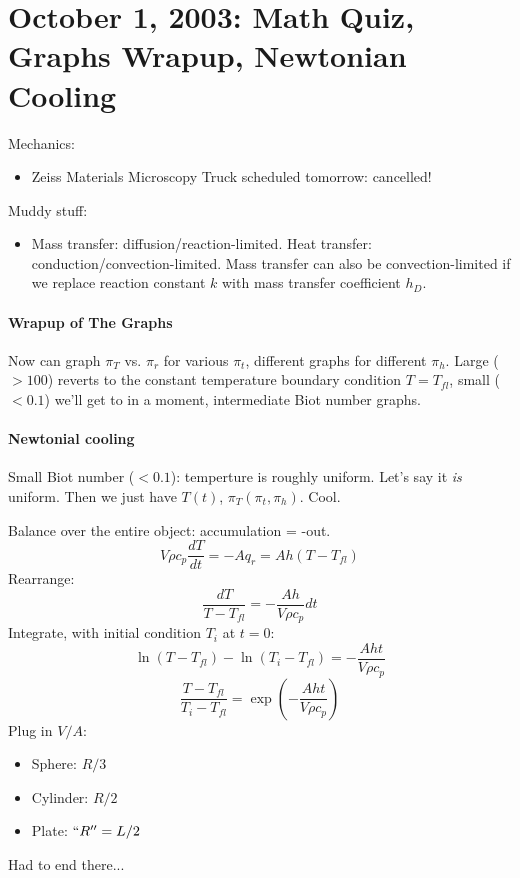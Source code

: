 \documentclass{report}
\begin{document}
\section{October 1, 2003: Math Quiz, Graphs Wrapup, Newtonian Cooling}

Mechanics:
\begin{itemize}
\item Zeiss Materials Microscopy Truck scheduled tomorrow: cancelled!
\end{itemize}

\noindent Muddy stuff:
\begin{itemize}
\item Mass transfer: diffusion/reaction-limited.  Heat transfer:
  conduction/convection-limited.  Mass transfer can also be convection-limited
  if we replace reaction constant $k$ with mass transfer coefficient $h_D$.
\end{itemize}

\paragraph{Wrapup of The Graphs}

Now can graph $\pi_T$ vs. $\pi_r$ for various $\pi_t$, different graphs for
different $\pi_h$.  Large ($>100$) reverts to the constant temperature boundary
condition $T=T_{fl}$, small ($<0.1$) we'll get to in a moment, intermediate
Biot number graphs.

\paragraph{Newtonial cooling}
Small Biot number ($<0.1$): temperture is roughly uniform.  Let's say it {\em
  is} uniform.  Then we just have $T(t)$, $\pi_T(\pi_t,\pi_h)$.  Cool.

Balance over the entire object: accumulation = -out.
$$V \rho c_p \frac{dT}{dt} = -A q_r = A h (T-T_{fl})$$
Rearrange:
$$\frac{dT}{T-T_{fl}} = -\frac{A h}{V\rho c_p} dt$$
Integrate, with initial condition $T_i$ at $t=0$:
$$\ln(T-T_{fl}) - \ln(T_i-T_{fl}) = -\frac{A h t}{V\rho c_p}$$
$$\frac{T-T_{fl}}{T_i-T_{fl}} = \exp\left(-\frac{A h t}{V\rho c_p}\right)$$
Plug in $V/A$:
\begin{itemize}
\item Sphere: $R/3$
\item Cylinder: $R/2$
\item Plate: $``R'' = L/2$
\end{itemize}
Had to end there...
\newpage
\end{document}
